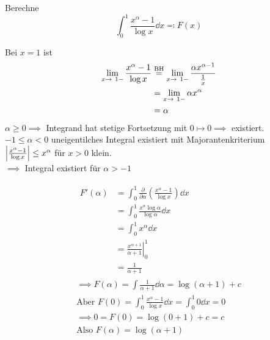 \begin{bsp}
	Berechne
	\[ \int_0^1 \frac{x^\alpha - 1}{\log x} \dd x \eqqcolon F(x) \]
	\begin{bem}
		Bei $x=1$ ist
		\[ \begin{split}
			\lim_{x \rightarrow 1-} \frac{x^\alpha - 1}{\log x}
				&\overset{\text{\scriptsize{BH}}}{=} \lim_{x \rightarrow 1-} \frac{\alpha x^{\alpha - 1}}{\frac{1}{x}} \\
				&= \lim_{x \rightarrow 1-} \alpha x^\alpha \\
				&= \alpha 
		\end{split} \]
		$\alpha \geq 0 \implies$ Integrand hat stetige Fortsetzung mit $0 \mapsto 0 \implies$ existiert. \\
		$-1 \leq \alpha < 0$ uneigentilches Integral existiert mit Majorantenkriterium $\abs{\frac{x^\alpha - 1}{\log x}} \leq x^\alpha$ für $x > 0$ klein. \\
		$\implies$ Integral existiert für $\alpha > -1$
	\end{bem}
	\begin{gather*}
		\begin{split}
			F'(\alpha)
				&= \int_0^1 \frac{\partial}{\partial \alpha} \left(\frac{x^\alpha - 1}{\log x}\right) \dd x \\
				&= \int_0^1 \frac{x^\alpha \log \alpha}{\log \alpha} \dd x \\
				&= \int_0^1 x^\alpha \dd x \\
				&= \left.\frac{x^{\alpha+1}}{\alpha+1}\right|_0^1 \\
				&= \frac{1}{\alpha + 1}
		\end{split} \\
		\implies F(\alpha) = \int \frac{1}{\alpha + 1} \dd \alpha = \log( \alpha + 1) + c \\
		\text{Aber } F(0) = \int_0^1 \frac{x^\alpha - 1}{\log x} \dd x = \int_0^1 0 \dd x = 0 \\
		\implies 0 = F(0) = \log( 0 + 1 ) + c = c \\
		\text{Also } F(\alpha) = \log( \alpha + 1 )
	\end{gather*}
\end{bsp}
